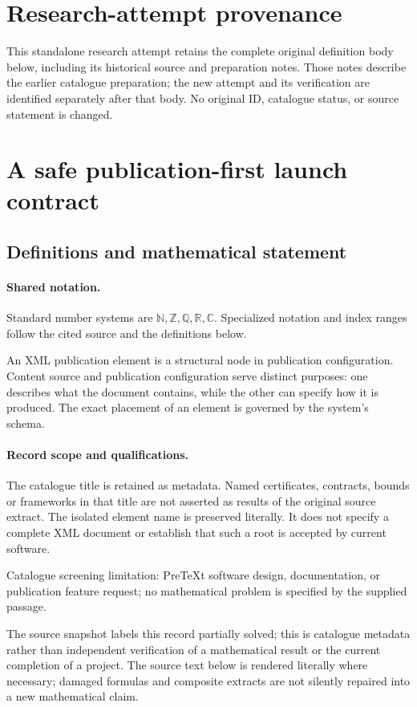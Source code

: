\documentclass[11pt]{article}
\begin{document}
\section*{Research-attempt provenance}
This standalone research attempt retains the complete original definition body below,
including its historical source and preparation notes. Those notes describe the
earlier catalogue preparation; the new attempt and its verification are identified
separately after that body. No original ID, catalogue status, or source statement is changed.

\section{A safe publication-first launch contract}\label{statement}

\subsection{Definitions and mathematical statement}

\paragraph{Shared notation.}Standard number systems are $\mathbb N,\mathbb Z,\mathbb Q,\mathbb R,\mathbb C$. Specialized notation and index ranges follow the cited source and the definitions below.


An XML publication element is a structural node in publication configuration. Content source and publication configuration serve distinct purposes: one describes what the document contains, while the other can specify how it is produced. The exact placement of an element is governed by the system's schema.
\paragraph{Record scope and qualifications.}
The catalogue title is retained as metadata. Named certificates, contracts, bounds or frameworks in that title are not asserted as results of the original source extract.
The isolated element name is preserved literally. It does not specify a complete XML document or establish that such a root is accepted by current software.

Catalogue screening limitation: PreTeXt software design, documentation, or publication feature request; no mathematical problem is specified by the supplied passage.

The source snapshot labels this record partially solved; this is catalogue metadata rather than independent verification of a mathematical result or the current completion of a project.
The source text below is rendered literally where necessary; damaged formulas and composite extracts are not silently repaired into a new mathematical claim.
\end{document}
